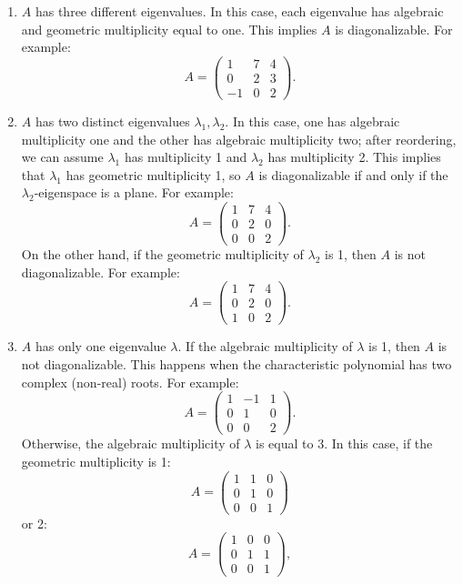 \documentclass[a4paper,12pt]{article}
\begin{document}
\begin{enumerate}
    \item \( A \) has three different eigenvalues. In this case, each eigenvalue has algebraic and geometric multiplicity equal to one. This implies \( A \) is diagonalizable. For example:
    \[
    A = \begin{pmatrix} 1 & 7 & 4 \\ 0 & 2 & 3 \\ -1 & 0 & 2 \end{pmatrix}.
    \]
    \item \( A \) has two distinct eigenvalues \( \lambda_1, \lambda_2 \). In this case, one has algebraic multiplicity one and the other has algebraic multiplicity two; after reordering, we can assume \( \lambda_1 \) has multiplicity 1 and \( \lambda_2 \) has multiplicity 2. This implies that \( \lambda_1 \) has geometric multiplicity 1, so \( A \) is diagonalizable if and only if the \( \lambda_2 \)-eigenspace is a plane. For example:
    \[
    A = \begin{pmatrix} 1 & 7 & 4 \\ 0 & 2 & 0 \\ 0 & 0 & 2 \end{pmatrix}.
    \]
    On the other hand, if the geometric multiplicity of \( \lambda_2 \) is 1, then \( A \) is not diagonalizable. For example:
    \[
    A = \begin{pmatrix} 1 & 7 & 4 \\ 0 & 2 & 0 \\ 1 & 0 & 2 \end{pmatrix}.
    \]
    \item \( A \) has only one eigenvalue \( \lambda \). If the algebraic multiplicity of \( \lambda \) is 1, then \( A \) is not diagonalizable. This happens when the characteristic polynomial has two complex (non-real) roots. For example:
    \[
    A = \begin{pmatrix} 1 & -1 & 1 \\ 0 & 1 & 0 \\ 0 & 0 & 2 \end{pmatrix}.
    \]
    Otherwise, the algebraic multiplicity of \( \lambda \) is equal to 3. In this case, if the geometric multiplicity is 1:
    \[
    A = \begin{pmatrix} 1 & 1 & 0 \\ 0 & 1 & 0 \\ 0 & 0 & 1 \end{pmatrix}
    \]
    or 2:
    \[
    A = \begin{pmatrix} 1 & 0 & 0 \\ 0 & 1 & 1 \\ 0 & 0 & 1 \end{pmatrix},
\]
\end{enumerate}
\end{document}
